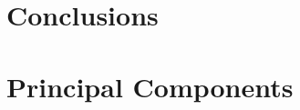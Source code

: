 \documentclass[english, oneside]{HYgradu}
\begin{document}


%
%

\chapter{Conclusions}






\clearpage
{} %



\newpage
\appendix
\chapter{Principal Components}
\end{document}
